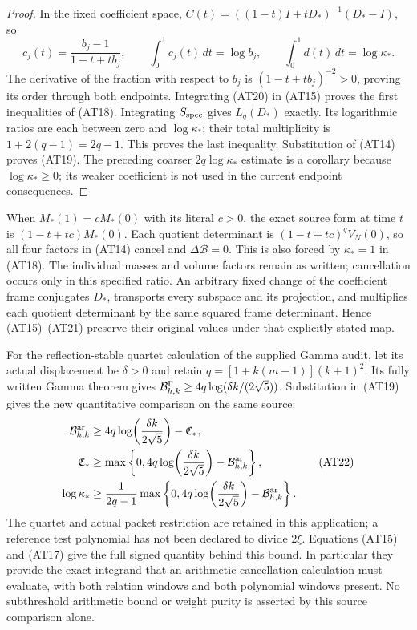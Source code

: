 \begin{proof}
In the fixed coefficient space,
$C(t)=((1-t)I+tD_*)^{-1}(D_*-I)$, so
\[
c_j(t)=\frac{b_j-1}{1-t+tb_j},\qquad
\int_0^1c_j(t)\,dt=\log b_j,\qquad
\int_0^1d(t)\,dt=\log\kappa_* .\tag{AT21}
\]
The derivative of the fraction with respect to $b_j$ is
$(1-t+tb_j)^{-2}>0$, proving its order through both endpoints.
Integrating (AT20) in (AT15) proves the first inequalities of
(AT18). Integrating $S_{\rm spec}$ gives $L_q(D_*)$ exactly.
Its logarithmic ratios are each between zero and $\log\kappa_*$;
their total multiplicity is $1+2(q-1)=2q-1$. This proves the last
inequality. Substitution of (AT14) proves (AT19).
The preceding coarser $2q\log\kappa_*$ estimate is a corollary
because $\log\kappa_*\ge0$; its weaker coefficient is not used
in the current endpoint consequences.
\end{proof}

When $M_*(1)=cM_*(0)$ with its literal $c>0$, the exact source
form at time $t$ is $(1-t+tc)M_*(0)$. Each quotient determinant
is $(1-t+tc)^qV_N(0)$, so all four factors in (AT14) cancel
and $\Delta\mathcal B=0$. This is also forced by
$\kappa_*=1$ in (AT18). The individual masses and volume
factors remain as written; cancellation occurs only in this
specified ratio. An arbitrary fixed change of the coefficient
frame conjugates $D_*$, transports every subspace and its
projection, and multiplies each quotient determinant by the
same squared frame determinant. Hence (AT15)--(AT21) preserve
their original values under that explicitly stated map.

For the reflection-stable quartet calculation of the supplied
Gamma audit, let its actual displacement be $\delta>0$ and
retain $q=[1+k(m-1)](k+1)^2$. Its fully written Gamma theorem
gives $\mathcal B^\Gamma_{h,k}\ge
4q\log(\delta k/(2\sqrt5))$. Substitution in (AT19) gives the
new quantitative comparison on the same source:
\[
\begin{aligned}
 \mathcal B^{\mathrm{ar}}_{h,k}&\ge
 4q\log\!\left(\frac{\delta k}{2\sqrt5}\right)-\mathfrak C_*,\\
 \mathfrak C_*&\ge\max\left\{0,
 4q\log\!\left(\frac{\delta k}{2\sqrt5}\right)-\mathcal B^{\mathrm{ar}}_{h,k}\right\},\\
 \log\kappa_*&\ge\frac{1}{2q-1}\max\left\{0,
 4q\log\!\left(\frac{\delta k}{2\sqrt5}\right)-\mathcal B^{\mathrm{ar}}_{h,k}\right\}.
\end{aligned}\tag{AT22}
\]
The quartet and actual packet restriction are retained in this
application; a reference test polynomial has not been declared
to divide $2\xi$. Equations (AT15) and (AT17) give the full
signed quantity behind this bound. In particular they provide
the exact integrand that an arithmetic cancellation calculation
must evaluate, with both relation windows and both polynomial
windows present. No subthreshold arithmetic bound or weight
purity is asserted by this source comparison alone.

